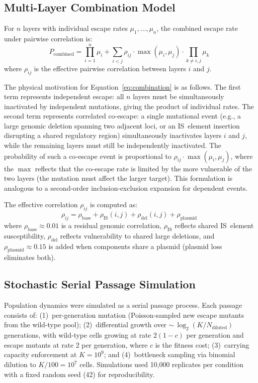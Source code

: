 \documentclass[journal=asbcd6,manuscript=article]{achemso}
\begin{document}
\subsection{Multi-Layer Combination Model}
For $n$ layers with individual escape rates $\mu_1, \ldots, \mu_n$, the combined escape rate under pairwise correlation is:
\begin{equation}
P_\text{combined} = \prod_{i=1}^n \mu_i + \sum_{i < j} \rho_{ij} \cdot \max(\mu_i, \mu_j) \cdot \prod_{k \neq i,j} \mu_k
\label{eq:combination}
\end{equation}
where $\rho_{ij}$ is the effective pairwise correlation between layers $i$ and $j$.

The physical motivation for Equation~\ref{eq:combination} is as follows. The first term represents independent escape: all $n$ layers must be simultaneously inactivated by independent mutations, giving the product of individual rates. The second term represents correlated co-escape: a single mutational event (e.g., a large genomic deletion spanning two adjacent loci, or an IS~element insertion disrupting a shared regulatory region) simultaneously inactivates layers $i$ and $j$, while the remaining layers must still be independently inactivated. The probability of such a co-escape event is proportional to $\rho_{ij} \cdot \max(\mu_i, \mu_j)$, where the $\max$ reflects that the co-escape rate is limited by the more vulnerable of the two layers (the mutation must affect the larger target). This formulation is analogous to a second-order inclusion-exclusion expansion for dependent events.

The effective correlation $\rho_{ij}$ is computed as:
\begin{equation}
\rho_{ij} = \rho_\text{base} + \rho_\text{IS}(i,j) + \rho_\text{del}(i,j) + \rho_\text{plasmid}
\label{eq:correlation}
\end{equation}
where $\rho_\text{base} \approx 0.01$ is a residual genomic correlation, $\rho_\text{IS}$ reflects shared IS~element susceptibility\cite{Consuegra2021}, $\rho_\text{del}$ reflects vulnerability to shared large deletions, and $\rho_\text{plasmid} \approx 0.15$ is added when components share a plasmid (plasmid loss eliminates both).

\subsection{Stochastic Serial Passage Simulation}
Population dynamics were simulated as a serial passage process. Each passage consists of: (1)~per-generation mutation (Poisson-sampled new escape mutants from the wild-type pool); (2)~differential growth over $\sim$\,$\log_2(K/N_\text{diluted})$ generations, with wild-type cells growing at rate $2(1-c)$ per generation and escape mutants at rate 2 per generation, where $c$ is the fitness cost; (3)~carrying capacity enforcement at $K = 10^9$; and (4)~bottleneck sampling via binomial dilution to $K/100 = 10^7$ cells. Simulations used 10,000 replicates per condition with a fixed random seed (42) for reproducibility.
\end{document}
